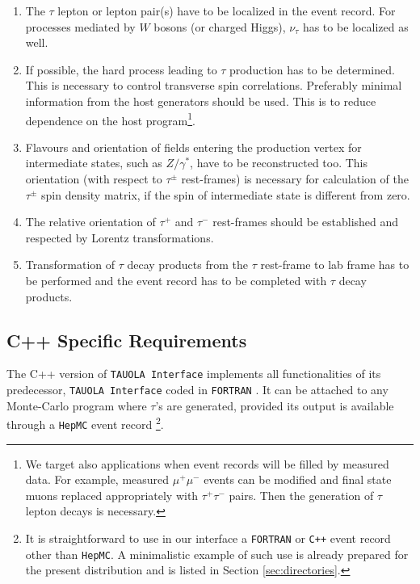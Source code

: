 \documentclass[]{Tauola_interface_design}
\begin{document}
\begin{enumerate}
\item The $\tau$ lepton or lepton pair(s) have to be localized in the 
event record. For processes mediated by $W$ bosons (or charged Higgs), 
 $\nu_\tau$ has to be localized as well.
\item
 If possible, the hard process leading to $\tau$ production has to be 
determined. This is necessary to control  transverse spin correlations.
Preferably minimal information from the host 
generators should be used. This is to reduce dependence on the host program\footnote{We 
target also applications when  event records will be filled by 
measured data. For example, 
measured $\mu^+ \mu^-$ events can be modified and final state muons replaced 
appropriately with $\tau^+ \tau^-$ pairs. Then the generation of $\tau$ lepton decays is necessary.}.
\item Flavours and orientation of fields entering the production vertex for intermediate states, such as 
$Z/\gamma^*$, 
 have to be reconstructed too. This orientation (with respect to $\tau^\pm$ 
rest-frames) is necessary for calculation of the $\tau^\pm$ spin density matrix,
if the spin of intermediate state is different from zero. 
\item The relative orientation of  $\tau^+$ and $\tau^-$ rest-frames 
should be established and respected by Lorentz transformations. 
\item Transformation of $\tau$ decay products from the $\tau$ rest-frame to 
lab frame has to be performed and the event record has to be completed  with $\tau$ decay products.
\end{enumerate}


\subsection{C++ Specific Requirements}

The C++ version of {\tt TAUOLA Interface} implements all functionalities
of its predecessor, {\tt TAUOLA  Interface} coded in  {\tt FORTRAN} \cite{Golonka:2003xt}.
It can be attached to any Monte-Carlo program where $\tau$'s
are generated, provided its output is available through a {\tt HepMC} \cite{Dobbs:2001ck} event record%
\footnote{It is straightforward to use in our interface 
a {\tt FORTRAN} or {\tt C++} event record other than {\tt HepMC}.
A minimalistic example of such use is already prepared for the present distribution and
is listed in Section \ref{sec:directories}.}.
\end{document}
